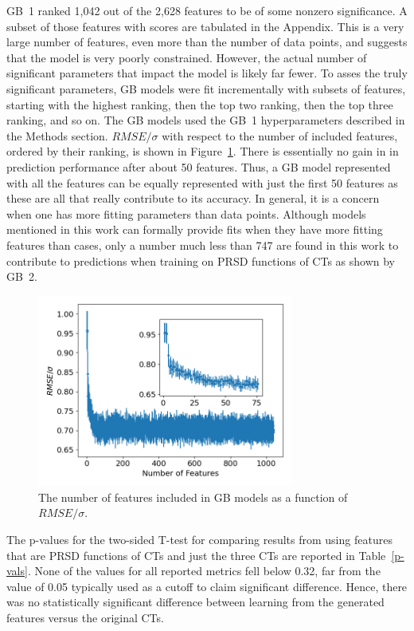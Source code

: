 \documentclass[11pt,a4paper]{article}
\begin{document}
\par
GB~1 ranked 1,042 out of the 2,628 features to be of some nonzero significance. A subset of those features with scores are tabulated in the Appendix. This is a very large number of features, even more than the number of data points, and suggests that the model is very poorly constrained. However, the actual number of significant parameters that impact the model is likely far fewer. To asses the truly significant parameters, GB models were fit incrementally with subsets of features, starting with the highest ranking, then the top two ranking, then the top three ranking, and so on. The GB models used the GB~1 hyperparameters described in the Methods section. $RMSE/\sigma$ with respect to the number of included features, ordered by their ranking, is shown in Figure~\ref{gb_features_loss}. There is essentially no gain in in prediction performance after about 50 features. Thus, a GB model represented with all the features can be equally represented with just the first 50 features as these are all that really contribute to its accuracy. In general, it is a concern when one has more fitting parameters than data points. Although models mentioned in this work can formally provide fits when they have more fitting features than cases, only a number much less than 747 are found in this work to contribute to predictions when training on PRSD functions of CTs as shown by GB~2.

\begin{figure}[H]
\centering
\includegraphics[width=0.75\textwidth]{figures/features_gb_loss.png}
\caption{The number of features included in GB models as a function of $RMSE/\sigma$.}
\label{gb_features_loss}
\end{figure}

\par
The p-values for the two-sided T-test for comparing results from using features that are PRSD functions of CTs and just the three CTs are reported in Table~\ref{p-vals}. None of the values for all reported metrics fell below 0.32, far from the value of 0.05 typically used as a cutoff to claim significant difference. Hence, there was no statistically significant difference between learning from the generated features versus the original CTs.
\end{document}
